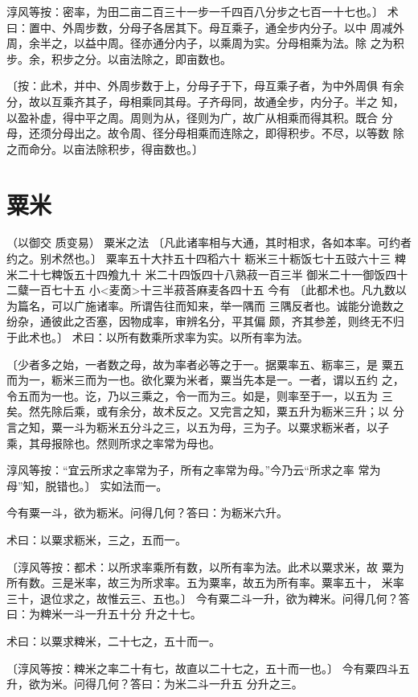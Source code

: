 \documentclass[a4paper,12pt,UTF8,twoside]{ctexbook}
\begin{document}
淳风等按：密率，为田二亩二百三十一步一千四百八分步之七百一十七也。〕 术曰：置中、外周步数，分母子各居其下。母互乘子，通全步内分子。以中 周减外周，余半之，以益中周。径亦通分内子，以乘周为实。分母相乘为法。除 之为积步。余，积步之分。以亩法除之，即亩数也。

〔按：此术，并中、外周步数于上，分母子于下，母互乘子者，为中外周俱 有余分，故以互乘齐其子，母相乘同其母。子齐母同，故通全步，内分子。半之 知，以盈补虚，得中平之周。周则为从，径则为广，故广从相乘而得其积。既合 分母，还须分母出之。故令周、径分母相乘而连除之，即得积步。不尽，以等数 除之而命分。以亩法除积步，得亩数也。〕 

\chapter{粟米}
（以御交 质变易） 粟米之法 〔凡此诸率相与大通，其时相求，各如本率。可约者约之。别术然也。〕 粟率五十大抃五十四稻六十 粝米三十粝饭七十五豉六十三 粺米二十七粺饭五十四飧九十 米二十四饭四十八熟菽一百三半 御米二十一御饭四十二糵一百七十五 小<麦啇>十三半菽荅麻麦各四十五 今有 〔此都术也。凡九数以为篇名，可以广施诸率。所谓告往而知来，举一隅而 三隅反者也。诚能分诡数之纷杂，通彼此之否塞，因物成率，审辨名分，平其偏 颇，齐其参差，则终无不归于此术也。〕 术曰：以所有数乘所求率为实。以所有率为法。

〔少者多之始，一者数之母，故为率者必等之于一。据粟率五、粝率三，是 粟五而为一，粝米三而为一也。欲化粟为米者，粟当先本是一。一者，谓以五约 之，令五而为一也。讫，乃以三乘之，令一而为三。如是，则率至于一，以五为 三矣。然先除后乘，或有余分，故术反之。又完言之知，粟五升为粝米三升；以 分言之知，粟一斗为粝米五分斗之三，以五为母，三为子。以粟求粝米者，以子 乘，其母报除也。然则所求之率常为母也。

淳风等按：“宜云所求之率常为子，所有之率常为母。”今乃云“所求之率 常为母”知，脱错也。〕 实如法而一。

今有粟一斗，欲为粝米。问得几何？答曰：为粝米六升。

术曰：以粟求粝米，三之，五而一。

〔淳风等按：都术：以所求率乘所有数，以所有率为法。此术以粟求米，故 粟为所有数。三是米率，故三为所求率。五为粟率，故五为所有率。粟率五十， 米率三十，退位求之，故惟云三、五也。〕 今有粟二斗一升，欲为粺米。问得几何？答曰：为粺米一斗一升五十分 升之十七。

术曰：以粟求粺米，二十七之，五十而一。

〔淳风等按：粺米之率二十有七，故直以二十七之，五十而一也。〕 今有粟四斗五升，欲为米。问得几何？答曰：为米二斗一升五 分升之三。
\end{document}
